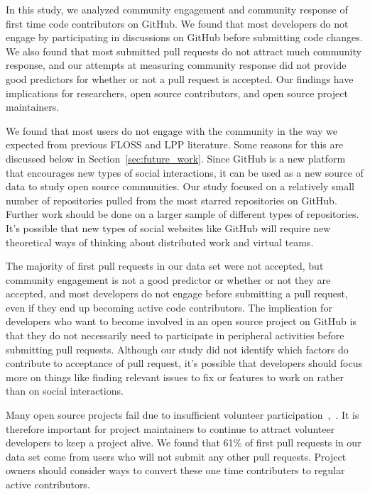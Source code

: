\documentclass{sigchi}
\begin{document}
In this study, we analyzed community engagement and community response of first
time code contributors on GitHub. We found that most developers do not engage by
participating in discussions on GitHub before submitting code changes. We also
found that most submitted pull requests do not attract much community response,
and our attempts at measuring community response did not provide good predictors
for whether or not a pull request is accepted. Our findings have implications
for researchers, open source contributors, and open source project maintainers.

We found that most users do not engage with the community in the way we expected
from previous FLOSS and LPP literature. Some reasons for this are discussed
below in Section~\ref{sec:future_work}. Since GitHub is a new platform that
encourages new types of social interactions, it can be used as a new source of
data to study open source communities. Our study focused on a relatively small
number of repositories pulled from the most starred repositories on GitHub.
Further work should be done on a larger sample of different types of
repositories. It's possible that new types of social websites like GitHub will
require new theoretical ways of thinking about distributed work and virtual
teams.

The majority of first pull requests in our data set were not accepted, but
community engagement is not a good predictor or whether or not they are
accepted, and most developers do not engage before submitting a pull request,
even if they end up becoming active code contributors. The implication for
developers who want to become involved in an open source project on GitHub is
that they do not necessarily need to participate in peripheral activities before
submitting pull requests. Although our study did not identify which factors do
contribute to acceptance of pull request, it's possible that developers should
focus more on things like finding relevant issues to fix or features to work on
rather than on social interactions.

Many open source projects fail due to insufficient volunteer
participation~\cite{crowston_defining_2003},~\cite{krishnamurthy_cave_2002}. It
is therefore important for project maintainers to continue to attract volunteer
developers to keep a project alive. We found that 61\% of first pull requests
in our data set come from users who will not submit any other pull requests.
Project owners should consider ways to convert these one time contributers to
regular active contributors.
\end{document}
